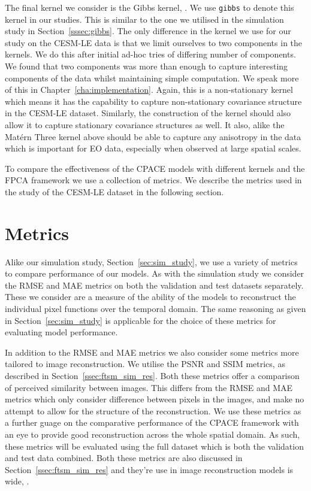 The final kernel we consider is the Gibbs kernel, \citep{gibbs_bayesian_1998}.
We use \verb*|gibbs| to denote this kernel in our studies.
This is similar to the one we utilised in the simulation study in Section~\ref{sssec:gibbs}. 
The only difference in the kernel we use for our study on the CESM-LE data is that we limit ourselves to two components in the kernels.
We do this after initial ad-hoc tries of differing number of components. 
We found that two components was more than enough to capture interesting components of the data whilst maintaining simple computation.
We speak more of this in Chapter~\ref{cha:implementation}.
Again, this is a non-stationary kernel which means it has the capability to capture non-stationary covariance structure in the CESM-LE dataset. 
Similarly, the construction of the kernel should also allow it to capture stationary covariance structures as well.
It also, alike the Mat\'ern Three kernel above should be able to capture any anisotropy in the data which is important for EO data, especially when observed at large spatial scales.

To compare the effectiveness of the CPACE models with different kernels and the FPCA framework we use a collection of metrics. 
We describe the metrics used in the study of the CESM-LE dataset in the following section. 

\section{Metrics \label{sec:metrics_cesm}}
Alike our simulation study, Section~\ref{sec:sim_study}, we use a variety of metrics to compare performance of our models.
As with the simulation study we consider the RMSE and MAE metrics on both the validation and test datasets separately.
These we consider are a measure of the ability of the models to reconstruct the individual pixel functions over the temporal domain.
The same reasoning as given in Section~\ref{sec:sim_study} is applicable for the choice of these metrics for evaluating model performance.

In addition to the RMSE and MAE metrics we also consider some metrics more tailored to image reconstruction.
We utilise the PSNR  and SSIM metrics, as described in Section~\ref{ssec:ftsm_sim_res}.
Both these metrics offer a comparison of perceived similarity between images.
This differs from the RMSE and MAE metrics which only consider difference between pixels in the images, and make no attempt to allow for the structure of the reconstruction.
We use these metrics as a further guage on the comparative performance of the CPACE framework with an eye to provide good reconstruction across the whole spatial domain.
As such, these metrics will be evaluated using the full dataset which is both the validation and test data combined. 
Both these metrics are also discussed in Section~\ref{ssec:ftsm_sim_res} and they're use in image reconstruction models is wide, \citep{hore_image_2010}.

